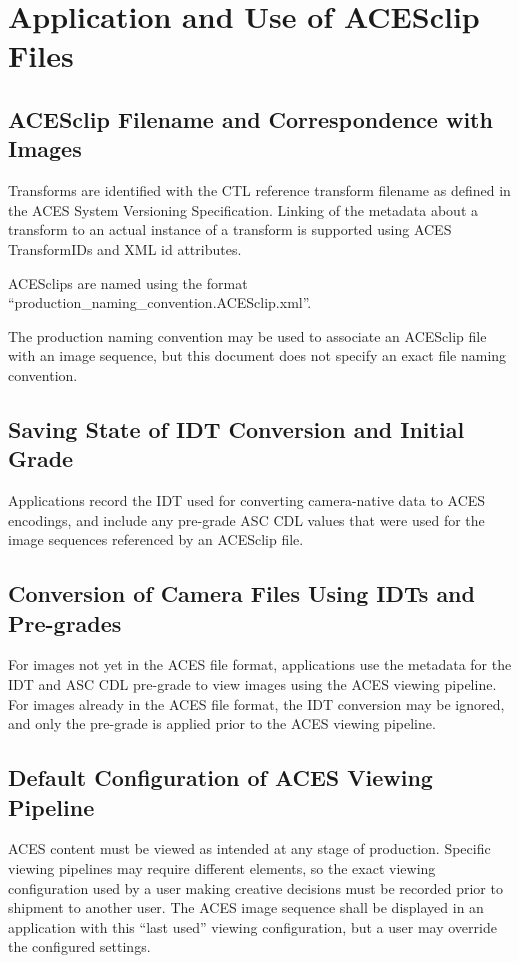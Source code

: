 \regularsectionformat	%
\chapter{Application and Use of ACESclip Files}

\section{ACESclip Filename and Correspondence with Images}
Transforms are identified with the CTL reference transform filename as defined in the ACES System Versioning Specification. Linking of the metadata about a transform to an actual instance of a transform is supported using ACES TransformIDs and XML id attributes.

ACESclips are named using the format ``production\_naming\_convention.ACESclip.xml''.

The production naming convention may be used to associate an ACESclip file with an image sequence, but this document does not specify an exact file naming convention.

\section{Saving State of IDT Conversion and Initial Grade}
Applications record the IDT used for converting camera-native data to ACES encodings, and include any pre-grade ASC CDL values that were used for the image sequences referenced by an ACESclip file.

\section{Conversion of Camera Files Using IDTs and Pre-grades}
For images not yet in the ACES file format, applications use the metadata for the IDT and ASC CDL pre-grade to view images using the ACES viewing pipeline. For images already in the ACES file format, the IDT conversion may be ignored, and only the pre-grade is applied prior to the ACES viewing pipeline.  

\section{Default Configuration of ACES Viewing Pipeline}
ACES content must be viewed as intended at any stage of production. Specific viewing pipelines may require different elements, so the exact viewing configuration used by a user making creative decisions must be recorded prior to shipment to another user. The ACES image sequence shall be displayed in an application with this ``last used'' viewing configuration, but a user may override the configured settings.

